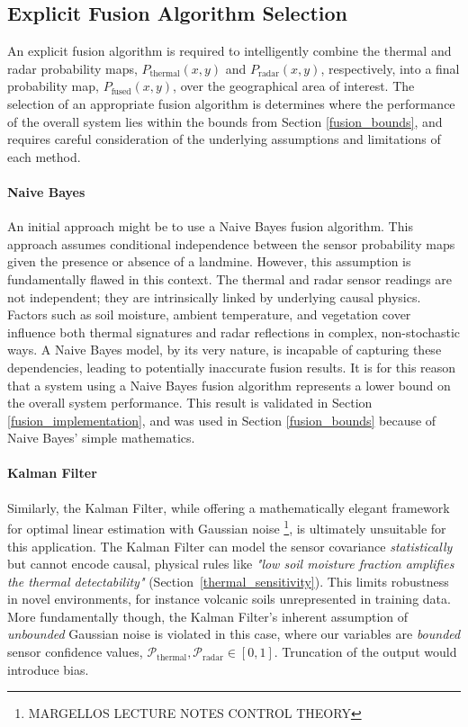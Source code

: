 \subsection{Explicit Fusion Algorithm Selection}

    An explicit fusion algorithm is required to intelligently combine the thermal and radar probability maps, \(P_\text{thermal}(x, y)\) and \(P_\text{radar}(x, y)\), respectively, into a final probability map, \(P_\text{fused}(x, y)\), over the geographical area of interest. The selection of an appropriate fusion algorithm is determines where the performance of the overall system lies within the bounds from Section \ref{fusion_bounds}, and requires careful consideration of the underlying assumptions and limitations of each method.
    
    \paragraph{Naive Bayes}
    
        An initial approach might be to use a Naive Bayes fusion algorithm. This approach assumes conditional independence between the sensor probability maps given the presence or absence of a landmine. However, this assumption is fundamentally flawed in this context. The thermal and radar sensor readings are not independent; they are intrinsically linked by underlying causal physics. Factors such as soil moisture, ambient temperature, and vegetation cover influence both thermal signatures and radar reflections in complex, non-stochastic ways. A Naive Bayes model, by its very nature, is incapable of capturing these dependencies, leading to potentially inaccurate fusion results. It is for this reason that a system using a Naive Bayes fusion algorithm represents a lower bound on the overall system performance. This result is validated in Section \ref{fusion_implementation}, and was used in Section \ref{fusion_bounds} because of Naive Bayes' simple mathematics.
    
    \paragraph{Kalman Filter}
    
        Similarly, the Kalman Filter, while offering a mathematically elegant framework for optimal linear estimation with Gaussian noise \footnote{MARGELLOS LECTURE NOTES CONTROL THEORY}, is ultimately unsuitable for this application. The Kalman Filter can model the sensor covariance \textit{statistically} but cannot encode causal, physical rules like \textit{"low soil moisture fraction amplifies the thermal detectability"} (Section~\ref{thermal_sensitivity}). This limits robustness in novel environments, for instance volcanic soils unrepresented in training data. More fundamentally though, the Kalman Filter's inherent assumption of \textit{unbounded} Gaussian noise is violated in this case, where our variables are \textit{bounded} sensor confidence values, \(\mathcal{P}_{\text{thermal}}, \mathcal{P}_{\text{radar}} \in [0,1]\). Truncation of the output would introduce bias.
    
